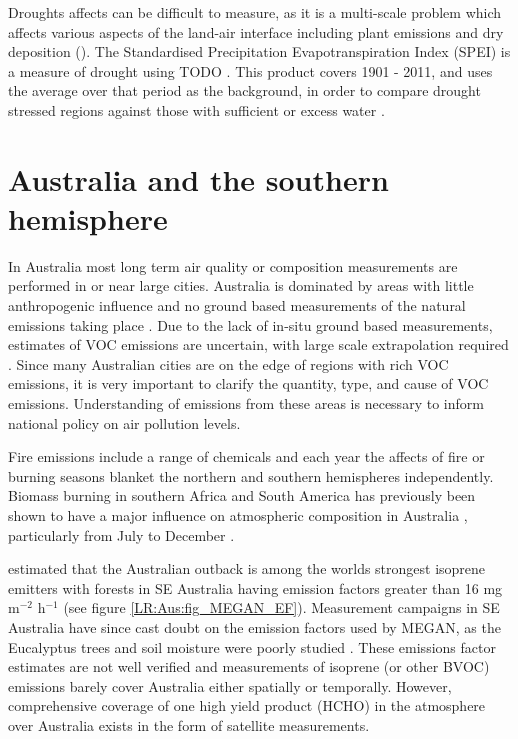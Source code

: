       
      Droughts affects can be difficult to measure, as it is a multi-scale problem which affects various aspects of the land-air interface including plant emissions and dry deposition (\cite{Wang2017}).
      The Standardised Precipitation Evapotranspiration Index (SPEI) is a measure of drought using TODO \cite{SPEI_website}.
      This product covers 1901 - 2011, and uses the average over that period as the background, in order to compare drought stressed regions against those with sufficient or excess water \cite{SPEI_website}.
      
    
    
  
\section{Australia and the southern hemisphere}
\label{LR:Aus}
  In Australia most long term air quality or composition measurements are performed in or near large cities.
  Australia is dominated by areas with little anthropogenic influence and no ground based measurements of the natural emissions taking place \citep{VanDerA2008}.
  Due to the lack of in-situ ground based measurements, estimates of VOC emissions are uncertain, with large scale extrapolation required \cite{Millet2006}.
  Since many Australian cities are on the edge of regions with rich VOC emissions, it is very important to clarify the quantity, type, and cause of VOC emissions.
  Understanding of emissions from these areas is necessary to inform national policy on air pollution levels.
  
  
  Fire emissions include a range of chemicals and each year the affects of fire or burning seasons blanket the northern and southern hemispheres independently.
  Biomass burning in southern Africa and South America has previously been shown to have a major influence on atmospheric composition in Australia \citep{Oltmans2001, Gloudemans2006, Edwards2006}, particularly from July to December \citep{Pak2003, Liu2016}.
  
  \cite{Guenther2006} estimated that the Australian outback is among the worlds strongest isoprene emitters with forests in SE Australia having emission factors greater than 16 mg m$^{-2}$ h$^{-1}$ (see figure \ref{LR:Aus:fig_MEGAN_EF}).
  Measurement campaigns in SE Australia have since cast doubt on the emission factors used by MEGAN, as the Eucalyptus trees and soil moisture were poorly studied \cite{Emmerson2016}.
  These emissions factor estimates are not well verified and measurements of isoprene (or other BVOC) emissions barely cover Australia either spatially or temporally.
  However, comprehensive coverage of one high yield product (HCHO) in the atmosphere over Australia exists in the form of satellite measurements.
  
